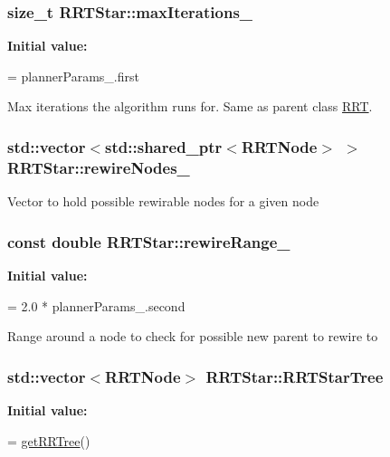 \subsubsection[{\texorpdfstring{max\+Iterations\+\_\+}{maxIterations_}}]{\setlength{\rightskip}{0pt plus 5cm}size\+\_\+t R\+R\+T\+Star\+::max\+Iterations\+\_\+}\hypertarget{classRRTStar_a08084959938e25bff534134845d42e14}{}\label{classRRTStar_a08084959938e25bff534134845d42e14}
{\bfseries Initial value\+:}
\begin{DoxyCode}
=
      plannerParams\_.first
\end{DoxyCode}
Max iterations the algorithm runs for. Same as parent class \hyperlink{classRRT}{R\+RT}. 
\subsubsection[{\texorpdfstring{rewire\+Nodes\+\_\+}{rewireNodes_}}]{\setlength{\rightskip}{0pt plus 5cm}std\+::vector$<$std\+::shared\+\_\+ptr$<${\bf R\+R\+T\+Node}$>$ $>$ R\+R\+T\+Star\+::rewire\+Nodes\+\_\+}\hypertarget{classRRTStar_a6a887af80bd8006376389011f27f7cba}{}\label{classRRTStar_a6a887af80bd8006376389011f27f7cba}
Vector to hold possible rewirable nodes for a given node 
\subsubsection[{\texorpdfstring{rewire\+Range\+\_\+}{rewireRange_}}]{\setlength{\rightskip}{0pt plus 5cm}const double R\+R\+T\+Star\+::rewire\+Range\+\_\+}\hypertarget{classRRTStar_a9a7ceb082951fc07e20f6704fbb1c58e}{}\label{classRRTStar_a9a7ceb082951fc07e20f6704fbb1c58e}
{\bfseries Initial value\+:}
\begin{DoxyCode}
=
      2.0 * plannerParams\_.second
\end{DoxyCode}
Range around a node to check for possible new parent to rewire to 
\subsubsection[{\texorpdfstring{R\+R\+T\+Star\+Tree}{RRTStarTree}}]{\setlength{\rightskip}{0pt plus 5cm}std\+::vector$<${\bf R\+R\+T\+Node}$>$ R\+R\+T\+Star\+::\+R\+R\+T\+Star\+Tree}\hypertarget{classRRTStar_a51cf408ef0d76ee5ee82726fc7bd26a5}{}\label{classRRTStar_a51cf408ef0d76ee5ee82726fc7bd26a5}
{\bfseries Initial value\+:}
\begin{DoxyCode}
=
      \hyperlink{classRRT_aba9e08111e7b76cd72acf2d0d4d560ae}{getRRTree}()
\end{DoxyCode}


